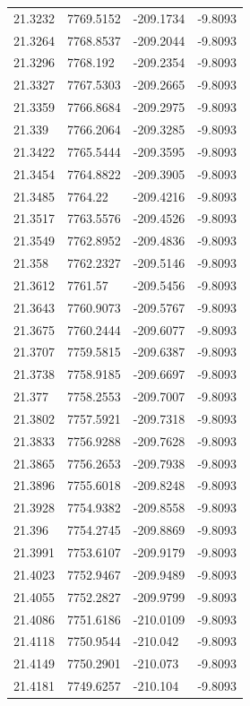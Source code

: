 \begin{table}[H]
\begin{tabular}{llll}
21.3232 & 7769.5152 & -209.1734 & -9.8093 \\
21.3264 & 7768.8537 & -209.2044 & -9.8093 \\
21.3296 & 7768.192 & -209.2354 & -9.8093 \\
21.3327 & 7767.5303 & -209.2665 & -9.8093 \\
21.3359 & 7766.8684 & -209.2975 & -9.8093 \\
21.339 & 7766.2064 & -209.3285 & -9.8093 \\
21.3422 & 7765.5444 & -209.3595 & -9.8093 \\
21.3454 & 7764.8822 & -209.3905 & -9.8093 \\
21.3485 & 7764.22 & -209.4216 & -9.8093 \\
21.3517 & 7763.5576 & -209.4526 & -9.8093 \\
21.3549 & 7762.8952 & -209.4836 & -9.8093 \\
21.358 & 7762.2327 & -209.5146 & -9.8093 \\
21.3612 & 7761.57 & -209.5456 & -9.8093 \\
21.3643 & 7760.9073 & -209.5767 & -9.8093 \\
21.3675 & 7760.2444 & -209.6077 & -9.8093 \\
21.3707 & 7759.5815 & -209.6387 & -9.8093 \\
21.3738 & 7758.9185 & -209.6697 & -9.8093 \\
21.377 & 7758.2553 & -209.7007 & -9.8093 \\
21.3802 & 7757.5921 & -209.7318 & -9.8093 \\
21.3833 & 7756.9288 & -209.7628 & -9.8093 \\
21.3865 & 7756.2653 & -209.7938 & -9.8093 \\
21.3896 & 7755.6018 & -209.8248 & -9.8093 \\
21.3928 & 7754.9382 & -209.8558 & -9.8093 \\
21.396 & 7754.2745 & -209.8869 & -9.8093 \\
21.3991 & 7753.6107 & -209.9179 & -9.8093 \\
21.4023 & 7752.9467 & -209.9489 & -9.8093 \\
21.4055 & 7752.2827 & -209.9799 & -9.8093 \\
21.4086 & 7751.6186 & -210.0109 & -9.8093 \\
21.4118 & 7750.9544 & -210.042 & -9.8093 \\
21.4149 & 7750.2901 & -210.073 & -9.8093 \\
21.4181 & 7749.6257 & -210.104 & -9.8093 \\

\end{tabular}
\end{table}
